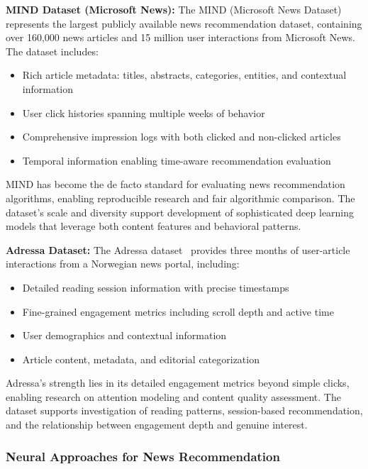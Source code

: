\textbf{MIND Dataset (Microsoft News):} The MIND (Microsoft News Dataset)~\cite{wu2020mind_news} represents the largest publicly available news recommendation dataset, containing over 160,000 news articles and 15 million user interactions from Microsoft News. The dataset includes:
\begin{itemize}
    \item Rich article metadata: titles, abstracts, categories, entities, and contextual information
    \item User click histories spanning multiple weeks of behavior
    \item Comprehensive impression logs with both clicked and non-clicked articles
    \item Temporal information enabling time-aware recommendation evaluation
\end{itemize}

MIND has become the de facto standard for evaluating news recommendation algorithms, enabling reproducible research and fair algorithmic comparison. The dataset's scale and diversity support development of sophisticated deep learning models that leverage both content features and behavioral patterns.

\textbf{Adressa Dataset:} The Adressa dataset~\cite{gulla2017adressa} provides three months of user-article interactions from a Norwegian news portal, including:
\begin{itemize}
    \item Detailed reading session information with precise timestamps
    \item Fine-grained engagement metrics including scroll depth and active time
    \item User demographics and contextual information
    \item Article content, metadata, and editorial categorization
\end{itemize}

Adressa's strength lies in its detailed engagement metrics beyond simple clicks, enabling research on attention modeling and content quality assessment. The dataset supports investigation of reading patterns, session-based recommendation, and the relationship between engagement depth and genuine interest.

\subsubsection{Neural Approaches for News Recommendation}

